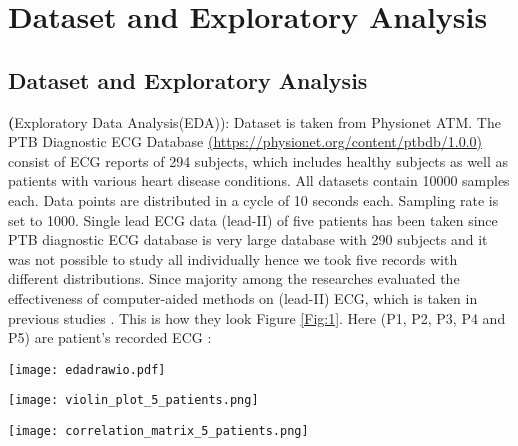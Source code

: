 
\chapter{Dataset and Exploratory Analysis} %

\label{c3} %

\section{Dataset and Exploratory Analysis}
 
\textbf({Exploratory Data Analysis(EDA)}): Dataset is taken from Physionet ATM. The PTB Diagnostic ECG Database \href{https://physionet.org/content/ptbdb/1.0.0}{(https://physionet.org/content/ptbdb/1.0.0)} consist of ECG reports of 294 subjects,  which includes healthy subjects as well as patients with various heart disease conditions. All datasets contain 10000 samples each. Data points are distributed in a cycle of 10 seconds each. Sampling rate is set to 1000. Single lead ECG data (lead-{II}) of five patients has been taken since PTB diagnostic ECG database is very large database with 290 subjects and it was not possible to study all individually hence we took five records with different distributions. Since majority among the researches evaluated the effectiveness of computer-aided methods on (lead-II) ECG,  which is taken in previous studies \cite{liu2021deep}. This is how they look Figure  \ref{Fig:1}. Here (P1, P2, P3, P4 and P5) are patient's recorded ECG :
\begin{figure*}[ht!]
    \centering
     \texttt{[image: edadrawio.pdf]}
     \caption{Patient's(P1,  P2,  P3,  P4 and P5) ECG Plot}
     \label{Fig:1}
   \end{figure*}
\begin{figure*}[h!]
  \centering
   \texttt{[image: violin\_plot\_5\_patients.png]}
  \caption{Dataset distribution using violin plot}
   \label{Fig:2}
\end{figure*}

 
   \begin{figure*}[h!]
    \centering
     \texttt{[image: correlation\_matrix\_5\_patients.png]}
     \caption{Dataset's correlation matrix} 
     \label{Fig:3}
    \end{figure*} 

